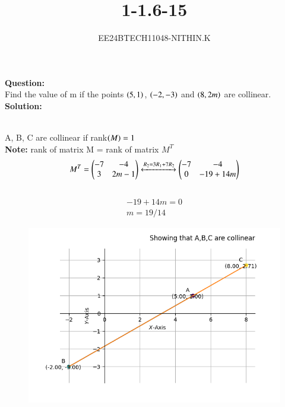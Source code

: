 \documentclass[journal]{IEEEtran}
\begin{document}


\title{1-1.6-15}
\author{EE24BTECH11048-NITHIN.K}
{\let\newpage\relax\maketitle}

\textbf{Question:} \\
Find the value of m if the points $\left(5, 1\right)$, $\left(-2, -3\right)$ and $\left(8, 2m\right)$ are collinear. \\
\textbf{Solution:} \\
\begin{table}[h!]   
      \centering
      
      \caption{}
\end{table} \\
A, B, C are collinear if rank$\left(M\right) = 1$ \\
\textbf{Note:} rank of matrix M = rank of matrix $M^T$ \\
 \begin{align}
	 M^T = \begin{pmatrix}
		 -7 & -4 \\
		 3 & 2m-1\end{pmatrix}
	 \xleftrightarrow{\substack{R_2 = 3R_1 + 7R_2}}
	 \begin{pmatrix}
		 -7 & -4 \\
		 0 & -19+14m\end{pmatrix}
 \end{align}
 \\
 \begin{align}
	 -19+14m=0 \\
	 m=19/14
 \end{align}
\begin{figure}[h]
\centering
\includegraphics[width=0.7\linewidth]{figs/Figure_1.png}
\caption{}
\label{graph}
\end{figure}
\end{document}
